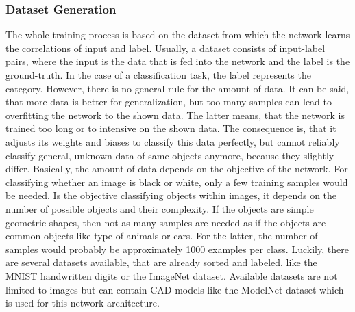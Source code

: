 \subsubsection{Dataset Generation}
\label{sec:dataset-generation}
The whole training process is based on the dataset from which the network learns the correlations of input and label.
Usually, a dataset consists of input-label pairs, where the input is the data that is fed into the network and the label is the ground-truth.
In the case of a classification task, the label represents the category.
However, there is no general rule for the amount of data.
It can be said, that more data is better for generalization, but too many samples can lead to overfitting the network to the shown data.
The latter means, that the network is trained too long or to intensive on the shown data.
The consequence is, that it adjusts its weights and biases to classify this data perfectly, but cannot reliably classify general, unknown data of same objects anymore, because they slightly differ.
Basically, the amount of data depends on the objective of the network.
For classifying whether an image is black or white, only a few training samples would be needed.
Is the objective classifying objects within images, it depends on the number of possible objects and their complexity.
If the objects are simple geometric shapes, then not as many samples are needed as if the objects are common objects like type of animals or cars.
For the latter, the number of samples would probably be approximately 1000 examples per class.
Luckily, there are several datasets available, that are already sorted and labeled, like the MNIST handwritten digits or the ImageNet dataset.
Available datasets are not limited to images but can contain CAD models like the ModelNet dataset which is used for this network architecture.

